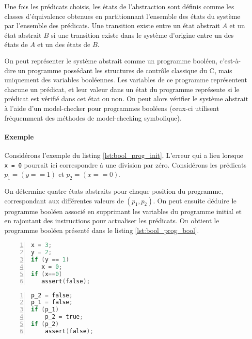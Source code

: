 Une fois les prédicats choisis, les états de l'abstraction sont définis comme
les classes d'équivalence obtenues en partitionnant l'ensemble des états du
système par l'ensemble des prédicats. Une transition existe entre un état
abstrait \(A\) et un état abstrait \(B\) si une transition existe dans le
système d'origine entre un des états de \(A\) et un des états de \(B\).

On peut représenter le système abstrait comme un programme booléen, c'est-à-dire
un programme possédant les structures de contrôle classique du C, mais
uniquement des variables booléennes. Les variables de ce programme représentent
chacune un prédicat, et leur valeur dans un état du programme représente si
le prédicat est vérifié dans cet état ou non. On peut alors vérifier le système
abstrait à l'aide d'un model-checker pour programmes booléens (ceux-ci utilisent
fréquemment des méthodes de model-checking symbolique).

\paragraph{Exemple}

Considérons l'exemple du listing \ref{lst:bool_prog_init}. L'erreur qui a lieu
lorsque \texttt{x = 0} pourrait ici correspondre à une division par
zéro. Considérons les prédicats \(p_1 = (y == 1)\) et \(p_2 = (x == 0)\).

On détermine quatre états abstraits pour chaque position du programme,
correspondant aux différentes valeurs de \((p_1, p_2)\). On peut ensuite
déduire le programme booléen associé en supprimant les variables du programme
initial et en rajoutant des instructions pour actualiser les prédicats. On
obtient le programme booléen présenté dans le listing \ref{lst:bool_prog_bool}.

\noindent\begin{minipage}{.45\textwidth}
\begin{lstlisting}[language=C, caption=Code initial, frame=single, numbers=left,
    label=lst:bool_prog_init, xleftmargin=1.6em]
x = 3;
y = 2;
if (y == 1)
   x = 0;
if (x==0)
   assert(false);
\end{lstlisting}
\end{minipage}\hfill
\begin{minipage}{.45\textwidth}
\begin{lstlisting}[language=C, caption=Programme booléen,frame=single, numbers=left,
    label=lst:bool_prog_bool]
p_2 = false;
p_1 = false;
if (p_1)
    p_2 = true;
if (p_2)
    assert(false);
\end{lstlisting}
\end{minipage}

